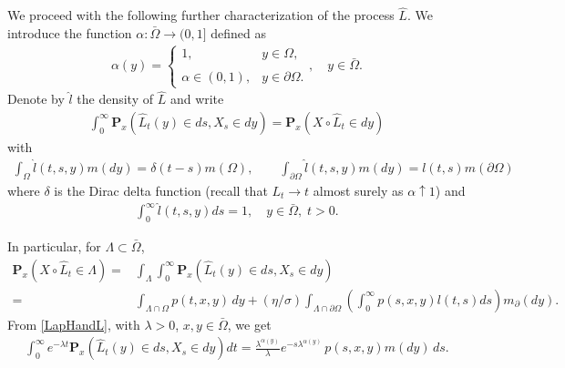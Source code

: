 \documentclass[11pt,a4paper]{article}
\begin{document}
We proceed with the following further characterization of the process $\hat{L}$.  We introduce the function $\alpha: \bar{\Omega} \to (0,1]$ defined as
\begin{align*}
\alpha(y) = 
\left\lbrace 
\begin{array}{ll}
1, & y \in \Omega,\\
\\
\alpha \in (0,1), & y \in \partial \Omega.
\end{array}
\right . , \quad y \in \bar{\Omega}.
\end{align*}
Denote by $\hat{l}$ the density of $\hat{L}$ and write
\begin{align*}
\int_0^\infty \mathbf{P}_x(\hat{L}_t(y) \in ds,  X_s \in dy) = \mathbf{P}_x(X \circ \hat{L}_t \in dy)
\end{align*}
with
\begin{align*}
\int_\Omega \hat{l}(t,s,y)m(dy) = \delta(t-s) m(\Omega), \qquad \int_{\partial \Omega} \hat{l}(t,s,y) m(dy) = l(t,s) m(\partial \Omega)
\end{align*}
where $\delta$ is the Dirac delta function (recall that $L_t \to t$ almost surely as $\alpha \uparrow 1$) and
\begin{align*}
\int_0^\infty \hat{l}(t,s,y) ds= 1, \quad y \in \bar{\Omega},\; t>0.
\end{align*}

In particular, for $\Lambda \subset \bar{\Omega}$,
\begin{align*}
\mathbf{P}_x(X \circ \hat{L}_t \in \Lambda) 
= &  \int_\Lambda \int_0^\infty \mathbf{P}_x(\hat{L}_t(y) \in ds,  X_s \in dy)\\
= & \int_{\Lambda \cap \Omega} p(t,x,y)\,dy +  (\eta/\sigma) \int_{\Lambda \cap \partial \Omega}  \left( \int_0^\infty p(s,x,y) l(t,s) ds \right) m_\partial(dy). 
\end{align*}
From  \eqref{LapHandL}, with $\lambda>0$, $x,y \in \bar{\Omega}$, we get
\begin{align}
\label{LapHATp}
\int_0^\infty e^{-\lambda t} \mathbf{P}_x(\hat{L}_t(y) \in ds,  X_s \in dy) dt  =  \frac{\lambda^{\alpha(y)}}{\lambda} e^{-s \lambda^{\alpha(y)}}\, p(s, x,y)m(dy)\, ds.
\end{align}
\end{document}

